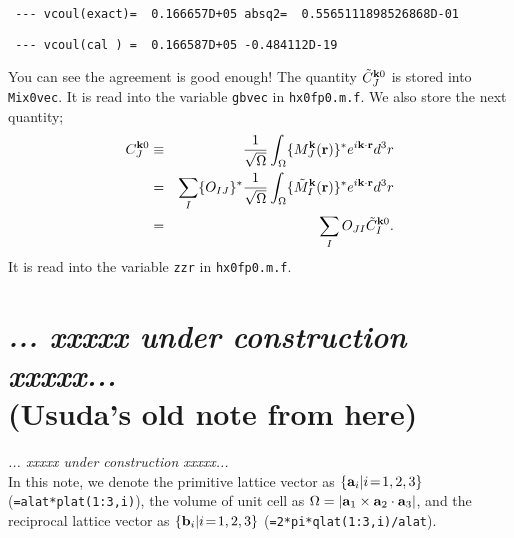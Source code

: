 \documentclass[a4paper,10pt,fleqn]{article}
\def\underconstruction{{\it... xxxxx under construction xxxxx...\\}}
\begin{document}
\vspace{\baselineskip}

\verb| --- vcoul(exact)=  0.166657D+05 absq2=  0.5565111898526868D-01|

\verb| --- vcoul(cal ) =  0.166587D+05 -0.484112D-19|

\vspace{\baselineskip}

You can see the agreement is good enough!
The quantity $\tilde{C}^{{\bf k}0}_J$ is stored into \verb|Mix0vec|.
It is read into the variable \verb|gbvec| in \verb|hx0fp0.m.f|.
We also store the next quantity;
\begin{eqnarray}
  C^{{\bf k}0}_J
  &\equiv& \frac{1}{\sqrt{\Omega}}\int_{\Omega}
     \{ M_J^{\bf k}({\bf r}) \}^* e^{i{\bf k \cdot r}}d^3r \nonumber \\
  &=& \sum_I \{ O_{IJ} \}^* \frac{1}{\sqrt{\Omega}}\int_{\Omega}
     \{ \tilde{M}_I^{\bf k}({\bf r}) \}^* e^{i{\bf k \cdot r}}d^3r \nonumber \\
  &=& \sum_I O_{JI} \tilde{C}^{{\bf k}0}_I.
\end{eqnarray}
It is read into the variable \verb|zzr| in \verb|hx0fp0.m.f|.

%


\newpage
\section{\underconstruction (Usuda's old note from here)}
\underconstruction
In this note, we denote the primitive lattice vector as
$\{{\bf a}_i| i\!=\!1,2,3\}$ (\verb#=alat*plat(1:3,i)#), 
the volume of unit cell as
$\Omega=|{\bf a}_1 \times {\bf a}_2 \cdot {\bf a}_3|$, and
the reciprocal lattice vector as $\{{\bf b}_i| i\!=\!1,2,3\}$
(\verb#=2*pi*qlat(1:3,i)/alat#).
\end{document}
